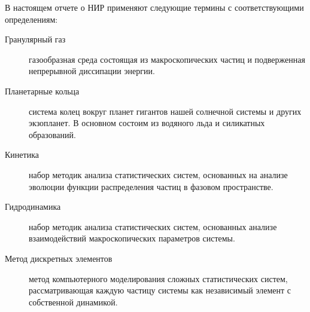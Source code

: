 \Defines %
В настоящем отчете о НИР применяют следующие термины с соответствующими определениям:
\begin{description}
\item[Гранулярный газ] газообразная среда состоящая из макроскопических частиц и подверженная непрерывной диссипации энергии.
\item[Планетарные кольца] система колец вокруг планет гигантов нашей солнечной системы и других экзопланет. 
В основном состоим из водяного льда и силикатных образований.
\item[Кинетика] набор методик анализа статистических систем, основанных на анализе эволюции функции распределения частиц в фазовом пространстве. 
\item[Гидродинамика] набор методик анализа статистических систем, основанных анализе взаимодействий макроскопических параметров системы.
\item[Метод дискретных элементов] метод компьютерного моделирования сложных статистических систем, 
рассматривающая каждую частицу системы как независимый элемент с собственной динамикой.
\end{description}

